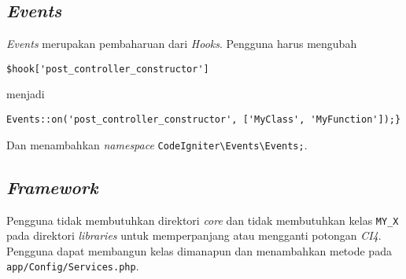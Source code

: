 \subsection{\textit{Events}}
\textit{Events} merupakan pembaharuan dari \textit{Hooks}. Pengguna harus mengubah
\begin{center}
	\verb|$hook['post_controller_constructor']|
\end{center} 
menjadi 
\begin{center} \verb|Events::on('post_controller_constructor', ['MyClass', 'MyFunction']);}|
\end{center}
Dan menambahkan \textit{namespace} \verb|CodeIgniter\Events\Events;|. 

\subsection{\textit{Framework}}
Pengguna tidak membutuhkan direktori \textit{core} dan tidak membutuhkan kelas \verb|MY_X| pada direktori \textit{libraries} untuk memperpanjang atau mengganti potongan \textit{CI4}. Pengguna dapat membangun kelas dimanapun dan menambahkan metode pada \verb|app/Config/Services.php|.
